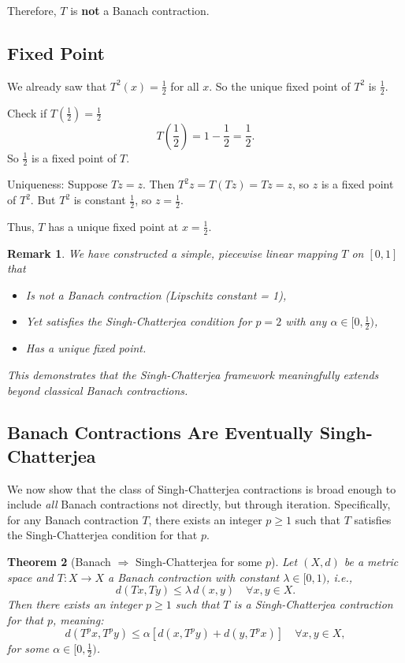 \documentclass[12pt]{article}
\newtheorem{theorem}{Theorem}[section]
\newtheorem{remark}[theorem]{Remark}
\begin{document}
Therefore, $ T $ is \textbf{not} a Banach contraction.

\subsection*{Fixed Point}

We already saw that $ T^2(x) = \frac{1}{2} $ for all $ x $. So the unique fixed point of $ T^2 $ is $ \frac{1}{2} $.

Check if $ T(\frac{1}{2}) = \frac{1}{2} $
\[
T\left(\frac{1}{2}\right) = 1 - \frac{1}{2} = \frac{1}{2}.
\]
So $ \frac{1}{2} $ is a fixed point of $ T $.

Uniqueness: Suppose $ Tz = z $. Then $ T^2 z = T(Tz) = Tz = z $, so $ z $ is a fixed point of $ T^2 $. But $ T^2 $ is constant $ \frac{1}{2} $, so $ z = \frac{1}{2} $.

Thus, $ T $ has a unique fixed point at $ x = \frac{1}{2} $.

\begin{remark}
We have constructed a simple, piecewise linear mapping $ T $ on $ [0,1] $ that
\begin{itemize}
\item Is not a Banach contraction (Lipschitz constant = 1),
\item Yet satisfies the Singh-Chatterjea condition for $ p = 2 $ with any $ \alpha \in [0, \tfrac{1}{2}) $,
\item Has a unique fixed point.
\end{itemize}

This demonstrates that the Singh-Chatterjea framework meaningfully extends beyond classical Banach contractions.
\end{remark}

\subsection{Banach Contractions Are Eventually Singh-Chatterjea}

We now show that the class of Singh-Chatterjea contractions is broad enough to include \emph{all} Banach contractions not directly, but through iteration. Specifically, for any Banach contraction $ T $, there exists an integer $ p \geq 1 $ such that $ T $ satisfies the Singh-Chatterjea condition for that $ p $.

\begin{theorem}[Banach $\Rightarrow$ Singh-Chatterjea for some $ p $]
Let $ (X, d) $ be a metric space and $ T: X \to X $ a Banach contraction with constant $ \lambda \in [0, 1) $, i.e.,
\[
d(Tx, Ty) \leq \lambda \, d(x, y) \quad \forall x, y \in X.
\]
Then there exists an integer $ p \geq 1 $ such that $ T $ is a Singh-Chatterjea contraction for that $ p $, meaning:
\[
d(T^p x, T^p y) \leq \alpha \left[ d(x, T^p y) + d(y, T^p x) \right] \quad \forall x, y \in X,
\]
for some $ \alpha \in [0, \tfrac{1}{2}) $.
\end{theorem}
\end{document}
